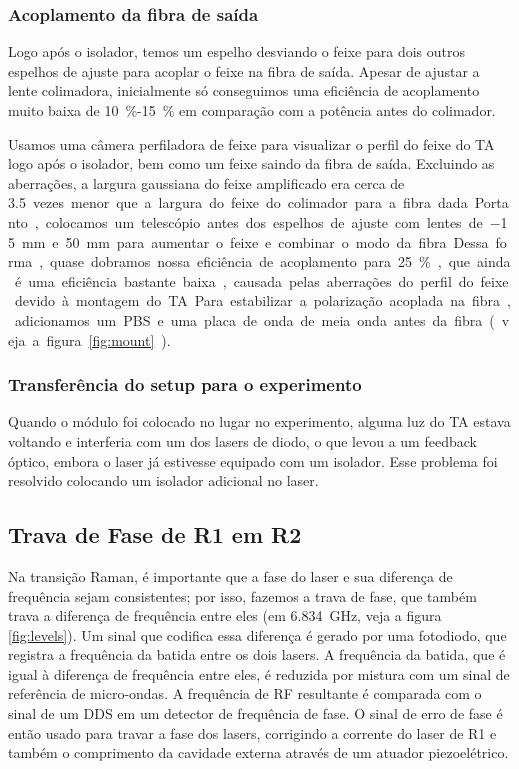 \subsubsection{Acoplamento da fibra de saída}
Logo após o isolador, temos um espelho desviando o feixe para dois outros espelhos de ajuste para acoplar o feixe na fibra de saída. Apesar de ajustar a lente colimadora, inicialmente só conseguimos uma eficiência de acoplamento muito baixa de \SI{10}{\percent}-\SI{15}{\percent} em comparação com a potência antes do colimador.

Usamos uma câmera perfiladora de feixe para visualizar o perfil do feixe do TA logo após o isolador, bem como um feixe saindo da fibra de saída. Excluindo as aberrações, a largura gaussiana do feixe amplificado era cerca de \SI{3,5} vezes menor que a largura do feixe do colimador para a fibra dada. Portanto, colocamos um telescópio antes dos espelhos de ajuste com lentes de \SI{-15}{mm} e \SI{50}{mm} para aumentar o feixe e combinar o modo da fibra. Dessa forma, quase dobramos nossa eficiência de acoplamento para \SI{25}{\percent}, que ainda é uma eficiência bastante baixa, causada pelas aberrações do perfil do feixe devido à montagem do \gls{TA}.

Para estabilizar a polarização acoplada na fibra, adicionamos um \gls{PBS} e uma placa de onda de meia onda antes da fibra (veja a figura \ref{fig:mount}).

\subsubsection{Transferência do setup para o experimento}
Quando o módulo foi colocado no lugar no experimento, alguma luz do \gls{TA} estava voltando e interferia com um dos lasers de diodo, o que levou a um feedback óptico, embora o laser já estivesse equipado com um isolador. Esse problema foi resolvido colocando um isolador adicional no laser.

\subsection{Trava de Fase de R1 em R2}
Na transição Raman, é importante que a fase do laser e sua diferença de frequência sejam consistentes; por isso, fazemos a trava de fase, que também trava a diferença de frequência entre eles (em \SI{6,834}{GHz}, veja a figura \ref{fig:levels}). Um sinal que codifica essa diferença é gerado por uma fotodiodo, que registra a frequência da batida entre os dois lasers. A frequência da batida, que é igual à diferença de frequência entre eles, é reduzida por mistura com um sinal de referência de micro-ondas. A frequência de RF resultante é comparada com o sinal de um DDS em um detector de frequência de fase. O sinal de erro de fase é então usado para travar a fase dos lasers, corrigindo a corrente do laser de R1 e também o comprimento da cavidade externa através de um atuador piezoelétrico.

